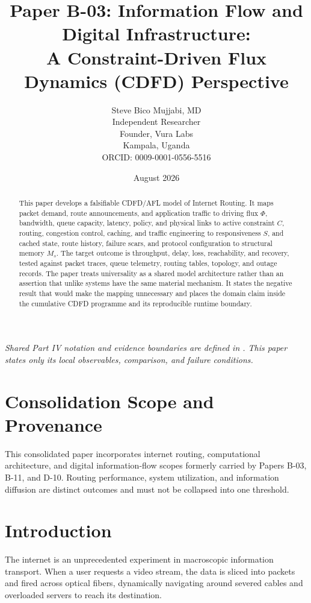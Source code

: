 \documentclass[11pt,a4paper]{article}
\title{\textbf{Paper B-03: Information Flow and Digital Infrastructure:\\ A Constraint-Driven Flux Dynamics (CDFD) Perspective}}
\author{Steve Bico Mujjabi, MD\\
\small Independent Researcher\\
\small Founder, Vura Labs\\
\small Kampala, Uganda\\
\small ORCID: 0009-0001-0556-5516}
\date{August 2026}
\begin{document}
\maketitle

\noindent\textit{Shared Part IV notation and evidence boundaries are defined in . This paper states only its local observables, comparison, and failure conditions.}


\begin{abstract}
This paper develops a falsifiable CDFD/AFL model of Internet Routing. It maps packet demand, route announcements, and application traffic to driving flux $\Phi$, bandwidth, queue capacity, latency, policy, and physical links to active constraint $C$, routing, congestion control, caching, and traffic engineering to responsiveness $S$, and cached state, route history, failure scars, and protocol configuration to structural memory $M_s$. The target outcome is throughput, delay, loss, reachability, and recovery, tested against packet traces, queue telemetry, routing tables, topology, and outage records. The paper treats universality as a shared model architecture rather than an assertion that unlike systems have the same material mechanism. It states the negative result that would make the mapping unnecessary and places the domain claim inside the cumulative CDFD programme and its reproducible runtime boundary.
\end{abstract}
\section*{Consolidation Scope and Provenance}
This consolidated paper incorporates internet routing, computational architecture, and digital information-flow scopes formerly carried by Papers B-03, B-11, and D-10. Routing performance, system utilization, and information diffusion are distinct outcomes and must not be collapsed into one threshold.


\section{Introduction}

The internet is an unprecedented experiment in macroscopic information transport. When a user requests a video stream, the data is sliced into packets and fired across optical fibers, dynamically navigating around severed cables and overloaded servers to reach its destination.
\end{document}
